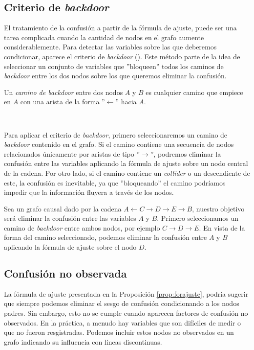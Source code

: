 \documentclass[oneside,openright,titlepage,numbers=noenddot,openany,headinclude,footinclude=true,
cleardoublepage=empty,abstractoff,BCOR=5mm,paper=a4,fontsize=12pt,main=spanish]{scrreprt}
\begin{document}
\subsection*{Criterio de \textit{backdoor}}

El tratamiento de la confusión a partir de la fórmula de ajuste, puede ser una tarea complicada cuando la cantidad de nodos en el grafo aumente considerablemente. Para detectar las variables sobre las que deberemos condicionar, aparece el criterio de \textit{backdoor} (\cite{causality2000}). Este método parte de la idea de seleccionar un conjunto de variables que ''bloqueen'' todos los caminos de \textit{backdoor} entre los dos nodos sobre los que queremos eliminar la confusión.\\

\begin{definition}
Un \textit{camino de backdoor} entre dos nodos $A$ y $B$ es cualquier camino que empiece en $A$ con una arista de la forma ''$\leftarrow$'' hacia $A$.
\end{definition}\

Para aplicar el criterio de \textit{backdoor}, primero seleccionaremos un camino de \textit{backdoor} contenido en el grafo. Si el camino contiene una secuencia de nodos relacionados únicamente por aristas de tipo ''$\to$'', podremos eliminar la confusión entre las variables aplicando la fórmula de ajuste sobre un nodo central de la cadena. Por otro lado, si el camino contiene un \textit{collider} o un descendiente de este, la confusión es inevitable, ya que ''bloqueando'' el camino podríamos impedir que la información fluyera a través de los nodos.

\begin{example}
Sea un grafo causal dado por la cadena $A \leftarrow C \to D \to E \to B$, nuestro objetivo será eliminar la confusión entre las variables $A$ y $B$. Primero seleccionamos un camino de \textit{backdoor} entre ambos nodos, por ejemplo $C \to D \to E$. En vista de la forma del camino seleccionado, podemos eliminar la confusión entre $A$ y $B$ aplicando la fórmula de ajuste sobre el nodo $D$.
\end{example}

\subsection*{Confusión no observada}

La fórmula de ajuste presentada en la Proposición \ref{prop:forajuste}, podría sugerir que siempre podemos eliminar el sesgo de confusión condicionando a los nodos padres. Sin embargo, esto no se cumple cuando aparecen factores de confusión no observados. En la práctica, a menudo hay variables que son difíciles de medir o que no fueron resgistradas. Podemos incluir estos nodos no observados en un grafo indicando su influencia con líneas discontinuas.\\
\end{document}
